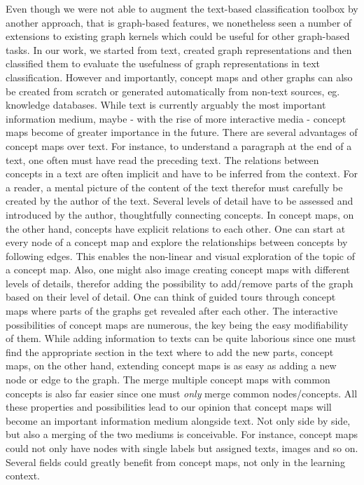 Even though we were not able to augment the text-based classification toolbox by another approach, that is graph-based features, we nonetheless seen a number of extensions to existing graph kernels which could be useful for other graph-based tasks.
In our work, we started from text, created graph representations and then classified them to evaluate the usefulness of graph representations in text classification.
However and importantly, concept maps and other graphs can also be created from scratch or generated automatically from non-text sources, eg. knowledge databases.
While text is currently arguably the most important information medium, maybe - with the rise of more interactive media - concept maps become of greater importance in the future.
There are several advantages of concept maps over text.
For instance, to understand a paragraph at the end of a text, one often must have read the preceding text.
The relations between concepts in a text are often implicit and have to be inferred from the context.
For a reader, a mental picture of the content of the text therefor must carefully be created by the author of the text.
Several levels of detail have to be assessed and introduced by the author, thoughtfully connecting concepts.
In concept maps, on the other hand, concepts have explicit relations to each other.
One can start at every node of a concept map and explore the relationships between concepts by following edges.
This enables the non-linear and visual exploration of the topic of a concept map.
Also, one might also image creating concept maps with different levels of details, therefor adding the possibility to add/remove parts of the graph based on their level of detail.
One can think of guided tours through concept maps where parts of the graphs get revealed after each other.
The interactive possibilities of concept maps are numerous, the key being the easy modifiability of them.
While adding information to texts can be quite laborious since one must find the appropriate section in the text where to add the new parts, concept maps, on the other hand, extending concept maps is as easy as adding a new node or edge to the graph.
The merge multiple concept maps with common concepts is also far easier since one must \textit{only} merge common nodes/concepts.
All these properties and possibilities lead to our opinion that concept maps will become an important information medium alongside text.
Not only side by side, but also a merging of the two mediums is conceivable.
For instance, concept maps could not only have nodes with single labels but assigned texts, images and so on.
Several fields could greatly benefit from concept maps, not only in the learning context.

